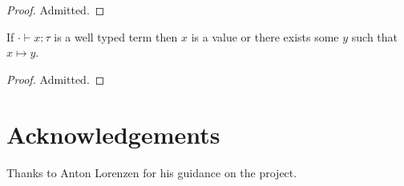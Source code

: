 \documentclass[nonacm]{acmart}
\begin{document}
\begin{proof}
  Admitted.
\end{proof}

\begin{theorem}[Progress]
  If $\cdot \vdash x : \tau$ is a well typed term then $x$ is a value or there
  exists some $y$ such that $x \mapsto y$.
\end{theorem}

\begin{proof}
  Admitted.
\end{proof}

\section{Acknowledgements}

Thanks to Anton Lorenzen for his guidance on the project.

\printbibliography
\end{document}
